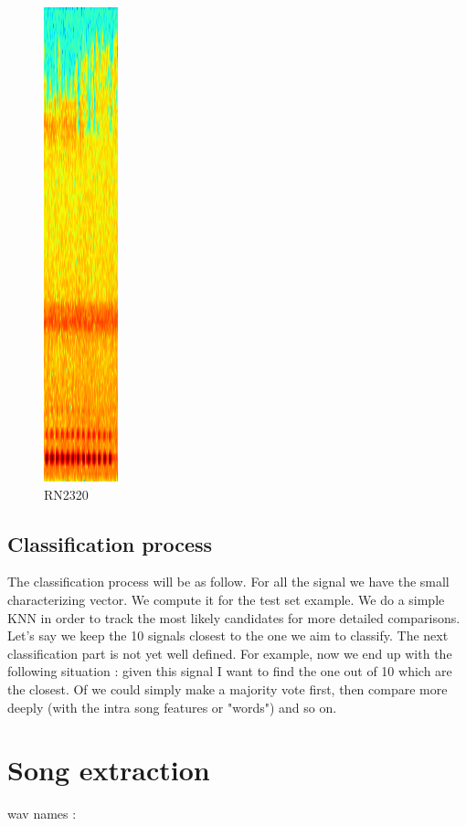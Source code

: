 \documentclass[a4paper]{article}
\begin{document}
\begin{figure}[H]
\begin{center}
\includegraphics[scale=0.2]{RN2320_feature.png}\caption{RN2320}\label{figure10}
\end{center}
\end{figure}

\subsection{Classification process}
The classification process will be as follow.
For all the signal we have the small characterizing vector. We compute it for the test set example. We do a simple KNN in order to track the most likely candidates for more detailed comparisons. Let's say we keep the 10 signals closest to the one we aim to classify.
The next classification part is not yet well defined. For example,
now we end up with the following situation : given this signal I want to find the one out of 10 which are the closest. Of we could simply make a majority vote first, then compare more deeply (with the intra song features or "words") and so on.
\section{Song extraction}

wav names :
\end{document}
